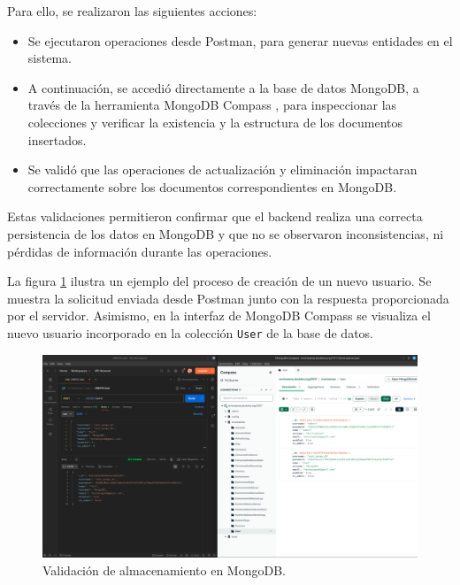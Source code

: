 Para ello, se realizaron las siguientes acciones:

\begin{itemize}
    \item Se ejecutaron operaciones desde Postman, para generar nuevas entidades en el
          sistema.
    \item A continuación, se accedió directamente a la base de datos MongoDB, a través de
          la herramienta MongoDB Compass \cite{MongoDBCompass}, para inspeccionar las
          colecciones y verificar la existencia y la estructura de los documentos
          insertados.
    \item Se validó que las operaciones de actualización y eliminación impactaran
          correctamente sobre los documentos correspondientes en MongoDB.
\end{itemize}

Estas validaciones permitieron confirmar que el backend realiza una correcta
persistencia de los datos en MongoDB y que no se observaron inconsistencias, ni
pérdidas de información durante las operaciones.

La figura \ref{fig:mongodb} ilustra un ejemplo del proceso de creación de un
nuevo usuario. Se muestra la solicitud enviada desde Postman junto con la
respuesta proporcionada por el servidor. Asimismo, en la interfaz de MongoDB
Compass se visualiza el nuevo usuario incorporado en la colección \texttt{User}
de la base de datos.

\begin{figure}[H]
    \centering
    \includegraphics[width=\textwidth]{Images/39_test_mongodb.png}
    \caption[Validación de almacenamiento en MongoDB]{Validación de almacenamiento en MongoDB.}
    \label{fig:mongodb}
\end{figure}


